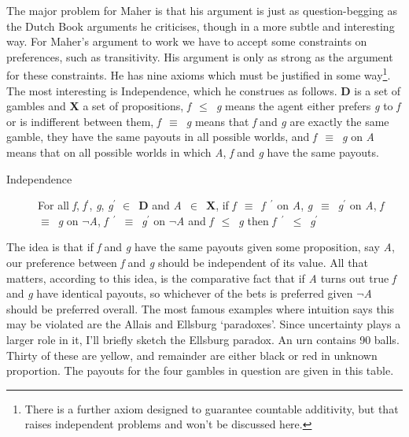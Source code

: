 The major problem for Maher is that his argument is just as question-begging as the Dutch Book arguments he criticises, though in a more subtle and interesting way. For Maher's argument to work we have to accept some constraints on preferences, such as transitivity. His argument is only as strong as the argument for these constraints. He has nine axioms which must be justified in some way\footnote{There is a further axiom designed to guarantee countable additivity, but that raises independent problems and won't be discussed here.}. The most interesting is Independence, which he construes as follows. \textbf{D} is a set of gambles and \textbf{X} a set of propositions, \textit{f}~${\leq}$~\textit{g} means the agent either prefers \textit{g} to \textit{f} or is indifferent between them, \textit{f}~${\equiv}$~\textit{g} means that \textit{f} and \textit{g} are exactly the same gamble, they have the same payouts in all possible worlds, and \textit{f}~${\equiv}$~\textit{g} on \textit{A} means that on all possible worlds in which \textit{A}, \textit{f} and \textit{g} have the same payouts.

\begin{description}
\item[Independence] For all \textit{f}, \textit{f}\(^\prime\), \textit{g}, \textit{g}\(^\prime\) ${\in}$~\textbf{D} and \textit{A}~${\in}$~\textbf{X}, if \textit{f}~${\equiv}$~\textit{f}~\(^\prime\) on \textit{A}, \textit{g}~${\equiv}$~\textit{g}\(^\prime\) on \textit{A}, \textit{f}~${\equiv}$~\textit{g} on ${\lnot}$\textit{A},\textit{ f}~\(^\prime\)~${\equiv}$~\textit{g}\(^\prime\) on ${\lnot}$\textit{A} and \textit{f}~${\leq}$~\textit{g} then \textit{f}~\(^\prime\)~${\leq}$~\textit{g}\(^\prime\) \cite[190]{Maher1993}
\end{description}

The idea is that if \textit{f} and \textit{g} have the same payouts given some proposition, say \textit{A}, our preference between \textit{f} and \textit{g} should be independent of its value. All that matters, according to this idea, is the comparative fact that if \textit{A} turns out true \textit{f} and \textit{g} have identical payouts, so whichever of the bets is preferred given ${\lnot}$\textit{A} should be preferred overall. The most famous examples where intuition says this may be violated are the Allais and Ellsburg `paradoxes'. Since uncertainty plays a larger role in it, I'll briefly sketch the Ellsburg paradox. An urn contains 90 balls. Thirty of these are yellow, and remainder are either black or red in unknown proportion. The payouts for the four gambles in question are given in this table.

